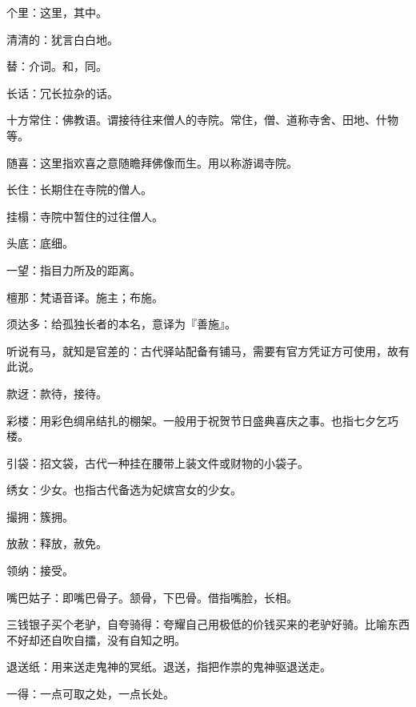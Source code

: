 \startbuffer[2372]
个里：这里，其中。
\stopbuffer


\startbuffer[2373]
清清的：犹言白白地。
\stopbuffer


\startbuffer[2374]
替：介词。和，同。
\stopbuffer


\startbuffer[2375]
长话：冗长拉杂的话。
\stopbuffer


\startbuffer[2376]
十方常住：佛教语。谓接待往来僧人的寺院。常住，僧、道称寺舍、田地、什物等。
\stopbuffer


\startbuffer[2377]
随喜：这里指欢喜之意随瞻拜佛像而生。用以称游谒寺院。
\stopbuffer


\startbuffer[2378]
长住：长期住在寺院的僧人。
\stopbuffer


\startbuffer[2379]
挂榻：寺院中暂住的过往僧人。
\stopbuffer


\startbuffer[2380]
头底：底细。
\stopbuffer


\startbuffer[2381]
一望：指目力所及的距离。
\stopbuffer


\startbuffer[2382]
檀那：梵语音译。施主；布施。
\stopbuffer


\startbuffer[2383]
须达多：给孤独长者的本名，意译为『善施』。
\stopbuffer


\startbuffer[2384]
听说有马，就知是官差的：古代驿站配备有铺马，需要有官方凭证方可使用，故有此说。
\stopbuffer


\startbuffer[2385]
款迓：款待，接待。
\stopbuffer


\startbuffer[2386]
彩楼：用彩色绸帛结扎的棚架。一般用于祝贺节日盛典喜庆之事。也指七夕乞巧楼。
\stopbuffer


\startbuffer[2387]
引袋：招文袋，古代一种挂在腰带上装文件或财物的小袋子。
\stopbuffer


\startbuffer[2388]
绣女：少女。也指古代备选为妃嫔宫女的少女。
\stopbuffer


\startbuffer[2389]
撮拥：簇拥。
\stopbuffer


\startbuffer[2390]
放赦：释放，赦免。
\stopbuffer


\startbuffer[2391]
领纳：接受。
\stopbuffer


\startbuffer[2392]
嘴巴姑子：即嘴巴骨子。颔骨，下巴骨。借指嘴脸，长相。
\stopbuffer


\startbuffer[2393]
三钱银子买个老驴，自夸骑得：夸耀自己用极低的价钱买来的老驴好骑。比喻东西不好却还自吹自擂，没有自知之明。
\stopbuffer


\startbuffer[2394]
退送纸：用来送走鬼神的冥纸。退送，指把作祟的鬼神驱退送走。
\stopbuffer


\startbuffer[2395]
一得：一点可取之处，一点长处。
\stopbuffer


